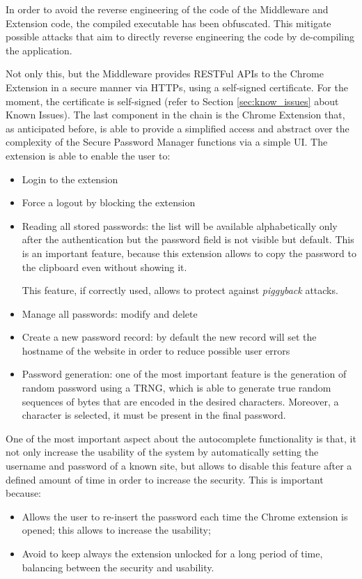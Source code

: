 In order to avoid the reverse engineering of the code of the Middleware and Extension code, the compiled executable has been obfuscated. This mitigate possible attacks that aim to directly reverse engineering the code by de-compiling the application.


Not only this, but the Middleware provides RESTFul APIs to the Chrome Extension in a secure manner via HTTPs, using a self-signed certificate. For the moment, the certificate is self-signed (refer to Section \ref{sec:know_issues} about Known Issues).\newline\newline
The last component in the chain is the Chrome Extension that, as anticipated before, is able to provide a simplified access and abstract over the complexity of the Secure Password Manager functions via a simple UI. The extension is able to enable the user to:
\begin{itemize}
	\item Login to the extension
	\item Force a logout by blocking the extension
	\item Reading all stored passwords: the list will be available alphabetically only after the authentication but the password field is not visible but default. This is an important feature, because this extension allows to copy the password to the clipboard even without showing it.
	
	This feature, if correctly used, allows to protect against \textit{piggyback} attacks.
	\item Manage all passwords: modify and delete
	\item Create a new password record: by default the new record will set the hostname of the website in order to reduce possible user errors
	\item Password generation: one of the most important feature is the generation of random password using a TRNG, which is able to generate true random sequences of bytes that are encoded in the desired characters. Moreover, a character is selected, it must be present in the final password.
\end{itemize}
One of the most important aspect about the autocomplete functionality is that, it not only increase the usability of the system by automatically setting the username and password of a known site, but allows to disable this feature after a defined amount of time in order to increase the security. This is important because:
\begin{itemize}
	\item Allows the user to re-insert the password each time the Chrome extension is opened; this allows to increase the usability;
	\item Avoid to keep always the extension unlocked for a long period of time, balancing between the security and usability.
\end{itemize}

